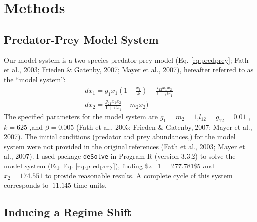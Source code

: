 \documentclass[12pt,twoside,openany]{reedthesis}
\begin{document}
\hypertarget{methods-1}{%
\section{Methods}\label{methods-1}}

\hypertarget{predator-prey-model-system}{%
\subsection{Predator-Prey Model System}\label{predator-prey-model-system}}

Our model system is a two-species predator-prey model (Eq. \eqref{eq:predprey}; Fath et al., 2003; Frieden \& Gatenby, 2007; Mayer et al., 2007), hereafter referred to as the ``model system'':
\begin{equation} 
\begin{array}{rcr}
  dx_1 = g_{1}x_{1}(1-\frac{x_1}{k})- \frac{l_{12} x_{1} x_{2}}{1+\beta x_{1}} \\
  dx_2 = \frac{g_{21}x_1 x_2}{1+\beta x_1} - m_2 x_2)
  \end{array}
  \label{eq:predprey}
\end{equation}
The specified parameters for the model system are \(g_1=m_2=1\),\(l_{12}=g_{12}= 0.01\) ,\(k=625\) ,and \(\beta=0.005\) (Fath et al., 2003; Frieden \& Gatenby, 2007; Mayer et al., 2007). The initial conditions (predator and prey abundances,) for the model system were not provided in the original references (Fath et al., 2003; Mayer et al., 2007). I used package \texttt{deSolve} in Program R (version 3.3.2) to solve the model system (Eq. Eq. \eqref{eq:predprey}), finding \$x\_1 = 277.781\$5 and \(x_2= 174.551\) to provide reasonable results. A complete cycle of this system corresponds to \(~11.145\) time units.

\hypertarget{inducing-a-regime-shift}{%
\subsection{Inducing a Regime Shift}\label{inducing-a-regime-shift}}
\end{document}
